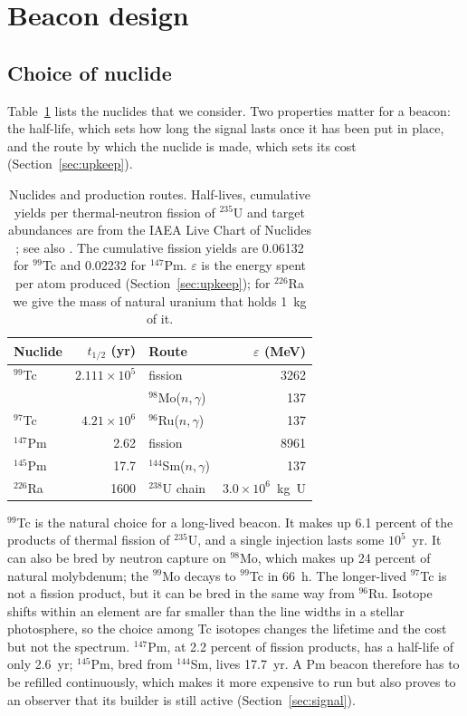 \documentclass[final,5p]{elsarticle}
\begin{document}
\section{Beacon design}
\label{sec:design}

\subsection{Choice of nuclide}
\label{sec:nuclide}

Table~\ref{tab:nuclides} lists the nuclides that we consider. Two properties matter for a beacon: the half-life, which sets how long the signal lasts once it has been put in place, and the route by which the nuclide is made, which sets its cost (Section~\ref{sec:upkeep}).

\begin{table}
\centering
\caption{Nuclides and production routes. Half-lives, cumulative yields per thermal-neutron fission of $^{235}$U and target abundances are from the IAEA Live Chart of Nuclides \citep{IAEA2026}; see also \citet{Kondev2021}. The cumulative fission yields are 0.06132 for $^{99}$Tc and 0.02232 for $^{147}$Pm. $\varepsilon$ is the energy spent per atom produced (Section~\ref{sec:upkeep}); for $^{226}$Ra we give the mass of natural uranium that holds 1~kg of it.}
\label{tab:nuclides}
\small
\setlength{\tabcolsep}{4pt}
\begin{tabular}{lrlr}
\toprule
Nuclide & $t_{1/2}$ (yr) & Route & $\varepsilon$ (MeV) \\
\midrule
$^{99}$Tc & $2.111\times10^{5}$ & fission & 3262 \\
 & & $^{98}$Mo($n,\gamma$) & 137 \\
$^{97}$Tc & $4.21\times10^{6}$ & $^{96}$Ru($n,\gamma$) & 137 \\
$^{147}$Pm & 2.62 & fission & 8961 \\
$^{145}$Pm & 17.7 & $^{144}$Sm($n,\gamma$) & 137 \\
$^{226}$Ra & 1600 & $^{238}$U chain & $3.0\times10^{6}$~kg~U \\
\bottomrule
\end{tabular}
\end{table}

$^{99}$Tc is the natural choice for a long-lived beacon. It makes up 6.1 percent of the products of thermal fission of $^{235}$U, and a single injection lasts some $10^{5}$~yr. It can also be bred by neutron capture on $^{98}$Mo, which makes up 24 percent of natural molybdenum; the $^{99}$Mo decays to $^{99}$Tc in 66~h. The longer-lived $^{97}$Tc is not a fission product, but it can be bred in the same way from $^{96}$Ru. Isotope shifts within an element are far smaller than the line widths in a stellar photosphere, so the choice among Tc isotopes changes the lifetime and the cost but not the spectrum. $^{147}$Pm, at 2.2 percent of fission products, has a half-life of only 2.6~yr; $^{145}$Pm, bred from $^{144}$Sm, lives 17.7~yr. A Pm beacon therefore has to be refilled continuously, which makes it more expensive to run but also proves to an observer that its builder is still active (Section~\ref{sec:signal}).
\end{document}
